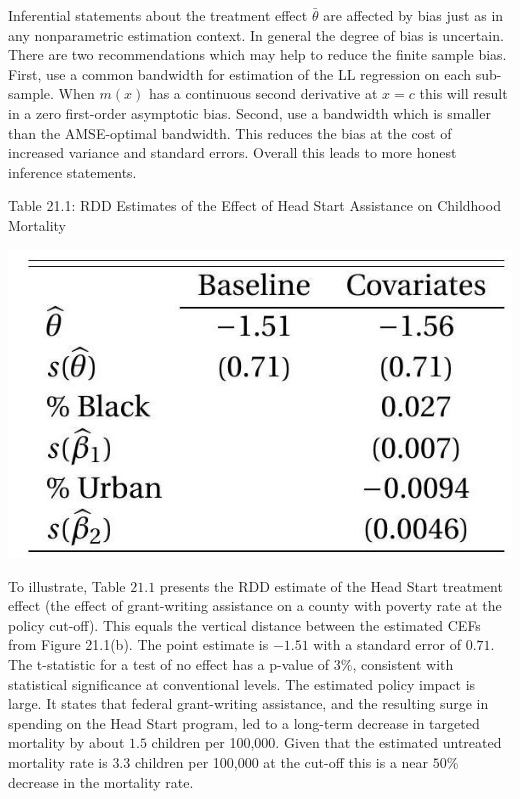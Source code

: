 \documentclass[10pt]{article}
\begin{document}
Inferential statements about the treatment effect $\bar{\theta}$ are affected by bias just as in any nonparametric estimation context. In general the degree of bias is uncertain. There are two recommendations which may help to reduce the finite sample bias. First, use a common bandwidth for estimation of the LL regression on each sub-sample. When $m(x)$ has a continuous second derivative at $x=c$ this will result in a zero first-order asymptotic bias. Second, use a bandwidth which is smaller than the AMSE-optimal bandwidth. This reduces the bias at the cost of increased variance and standard errors. Overall this leads to more honest inference statements.

Table 21.1: RDD Estimates of the Effect of Head Start Assistance on Childhood Mortality

\includegraphics[max width=\textwidth]{2022_10_23_bb8a8d8a5dc56cf142a9g-06}

To illustrate, Table $21.1$ presents the RDD estimate of the Head Start treatment effect (the effect of grant-writing assistance on a county with poverty rate at the policy cut-off). This equals the vertical distance between the estimated CEFs from Figure 21.1(b). The point estimate is $-1.51$ with a standard error of $0.71$. The t-statistic for a test of no effect has a p-value of $3 \%$, consistent with statistical significance at conventional levels. The estimated policy impact is large. It states that federal grant-writing assistance, and the resulting surge in spending on the Head Start program, led to a long-term decrease in targeted mortality by about $1.5$ children per 100,000. Given that the estimated untreated mortality rate is $3.3$ children per 100,000 at the cut-off this is a near $50 \%$ decrease in the mortality rate.
\end{document}
